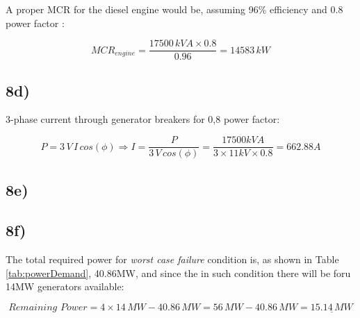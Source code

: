 A proper MCR for the diesel engine would be, assuming 96\% efficiency and 0.8 power factor \cite{CatGenerators}:

\[
MCR_{engine}=\frac{17500 \, kV\!A \times 0.8}{0.96}=14583 \, kW
\]


\subsection*{8d)}


3-phase current through generator breakers for 0,8 power factor:

\[
P=3\,V\,I\,cos(\phi) \Rightarrow I=\frac{P}{3\,V\,cos(\phi)}=\frac{17500 kVA}{3 \times 11 kV \times 0.8}=662.88 A
\]

\subsection*{8e)}


\subsection*{8f)}


The total required power for \textit{worst case failure} condition is, as shown in Table \ref{tab:powerDemand}, 40.86MW, and since the in such condition there will be foru 14MW generators available: 

\[
Remaining\,\,Power=4 \times 14\,MW - 40.86\,MW = 56\,MW - 40.86\,MW = \underline{15.14 \, MW}
\]
